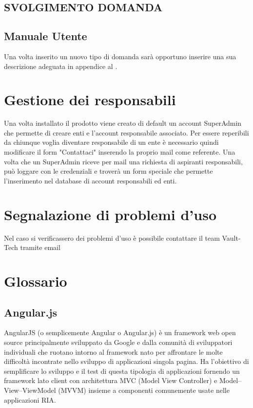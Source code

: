 \documentclass[a4paper, titlepage]{article}
\begin{document}
	\subsection{SVOLGIMENTO DOMANDA}
	
	\subsection{Manuale Utente}
	Una volta inserito un nuovo tipo di domanda sarà opportuno inserire una sua descrizione adeguata in appendice al .
	
	\newpage
	\section{Gestione dei responsabili} %
	Una volta installato il prodotto viene creato di default un account SuperAdmin che permette di creare enti e l'account responsabile associato. Per essere reperibili da chiunque voglia diventare responsabile di un ente è necessario quindi modificare il form "Contattaci" inserendo la proprio mail come referente. Una volta che un SuperAdmin riceve per mail una richiesta di aspiranti responsabili, può loggare con le credenziali    e troverà un form speciale che permette l'inserimento nel database di account responsabili ed enti.
	
	\section{Segnalazione di problemi d'uso}
	Nel caso si verificassero dei problemi d'uso è possibile contattare il team Vault-Tech tramite email 
	
	
	\newpage
	\appendix
	
	\section{Glossario}
	\label{gl} 
	
	\subsection{Angular.js}
	AngularJS (o semplicemente Angular o Angular.js) è un framework web open source principalmente sviluppato da Google e dalla comunità di sviluppatori individuali che ruotano intorno al framework nato per affrontare le molte difficoltà incontrate nello sviluppo di applicazioni singola pagina. Ha l'obiettivo di semplificare lo sviluppo e il test di questa tipologia di applicazioni fornendo un framework lato client con architettura MVC (Model View Controller) e Model–View–ViewModel (MVVM) insieme a componenti comunemente usate nelle applicazioni RIA.
	
\end{document}
